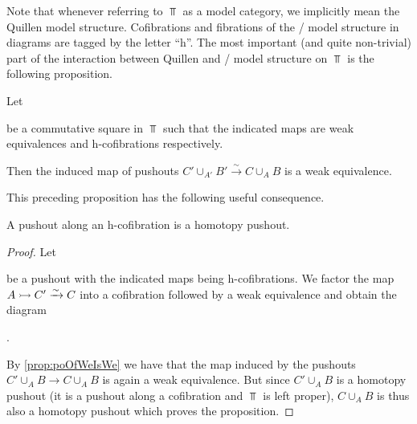 Note that whenever referring to $\Top$ as a model category, we implicitly mean the Quillen model structure. 
Cofibrations and fibrations of the \Strom/ model structure in diagrams are tagged by the letter ``h''.
The most important (and quite non-trivial) part of the interaction between Quillen and \Strom/ model structure on $\Top$ is the following proposition.
\begin{prop}\label{prop:poOfWeIsWe}
    Let 
    \begin{center}
    \end{center}
    be a commutative square in $\Top$ such that the indicated maps are weak equivalences and h-cofibrations respectively.

    Then the induced map of pushouts $C'\cup_{A'}B'\xrightarrow{\sim} C\cup_AB$ is a weak equivalence.
    \begin{reference}
        \cite[Proposition 1.1]{hcolim_bar}
    \end{reference}
\end{prop}
This preceding proposition has the following useful consequence.
\begin{corollary}\label{prop:poAlongHCofibIsHtpyPo}
    A pushout along an h-cofibration is a homotopy pushout.
    \begin{proof}
        Let
        \begin{center}
        \end{center}
        be a pushout with the indicated maps being h-cofibrations.
        We factor the map $A\xtailrightarrow{} C'\xrightarrow{\sim} C$ into a cofibration followed by a weak equivalence and obtain the diagram
        \begin{center}
            \;.
        \end{center}
        By \cref{prop:poOfWeIsWe} we have that the map induced by the pushouts $C'\cup_AB\to C\cup_AB$ is again a weak equivalence.
        But since $C'\cup_AB$ is a homotopy pushout (it is a pushout along a cofibration and $\Top$ is left proper), $C\cup_AB$ is thus also a homotopy pushout which proves the proposition.%
    \end{proof}
\end{corollary}
